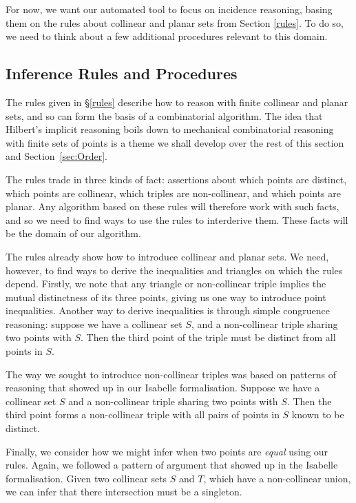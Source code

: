 For now, we want our automated tool to focus on incidence reasoning, basing them on the rules about collinear and planar sets from Section \ref{rules}. To do so, we need to think about a few additional procedures relevant to this domain.

\subsection{Inference Rules and Procedures}
The rules given in \S\ref{rules} describe how to reason with finite collinear and planar sets, and so can form the basis of a combinatorial algorithm. The idea that Hilbert's implicit reasoning boils down to mechanical combinatorial reasoning with finite sets of points is a theme we shall develop over the rest of this section and Section~\ref{sec:Order}. 

The rules trade in three kinds of fact: assertions about which points are distinct, which points are collinear, which triples are non-collinear, and which points are planar. Any algorithm based on these rules will therefore work with such facts, and so we need to find ways to use the rules to interderive them. These facts will be the domain of our algorithm.

The rules already show how to introduce collinear and planar sets. We need, however, to find ways to derive the inequalities and triangles on which the rules depend. Firstly, we note that any triangle or non-collinear triple implies the mutual distinctness of its three points, giving us one way to introduce point inequalities. Another way to derive inequalities is through simple congruence reasoning: suppose we have a collinear set $S$, and a non-collinear triple sharing two points with $S$. Then the third point of the triple must be distinct from all points in $S$. 

The way we sought to introduce non-collinear triples was based on patterns of reasoning that showed up in our Isabelle formalisation. Suppose we have a collinear set $S$ and a non-collinear triple sharing two points with $S$. Then the third point forms a non-collinear triple with all pairs of points in $S$ known to be distinct.

Finally, we consider how we might infer when two points are \emph{equal} using our rules. Again, we followed a pattern of argument that showed up in the Isabelle formalisation. Given two collinear sets $S$ and $T$, which have a non-collinear union, we can infer that there intersection must be a singleton.

